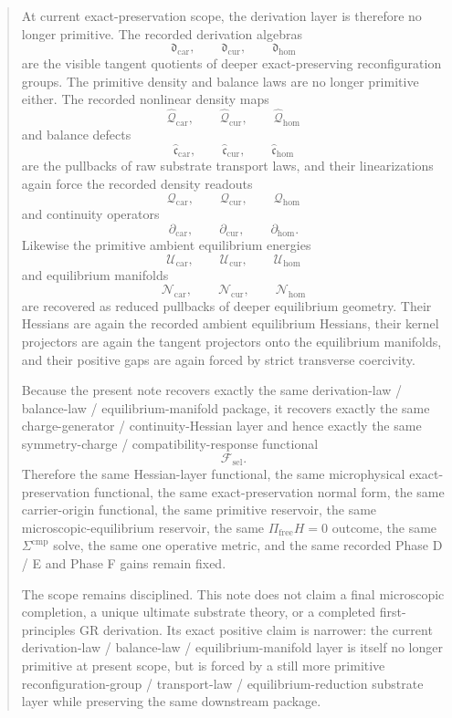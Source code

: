 \documentclass[11pt]{article}
\newcommand{\StemFunctional}{\mathscr F_{\mathrm{sel}}}
\newcommand{\TensorDensity}{\mathcal Q_{\mathrm{car}}}
\newcommand{\CurDensity}{\mathcal Q_{\mathrm{cur}}}
\newcommand{\HomDensity}{\mathcal Q_{\mathrm{hom}}}
\newcommand{\TensorCont}{\partial_{\mathrm{car}}}
\newcommand{\CurCont}{\partial_{\mathrm{cur}}}
\newcommand{\HomCont}{\partial_{\mathrm{hom}}}
\newcommand{\TensorDerAlg}{\mathfrak d_{\mathrm{car}}}
\newcommand{\CurDerAlg}{\mathfrak d_{\mathrm{cur}}}
\newcommand{\HomDerAlg}{\mathfrak d_{\mathrm{hom}}}
\newcommand{\TensorPrimitiveDensity}{\widehat{\mathcal Q}_{\mathrm{car}}}
\newcommand{\CurPrimitiveDensity}{\widehat{\mathcal Q}_{\mathrm{cur}}}
\newcommand{\HomPrimitiveDensity}{\widehat{\mathcal Q}_{\mathrm{hom}}}
\newcommand{\TensorBalance}{\widehat{\mathfrak c}_{\mathrm{car}}}
\newcommand{\CurBalance}{\widehat{\mathfrak c}_{\mathrm{cur}}}
\newcommand{\HomBalance}{\widehat{\mathfrak c}_{\mathrm{hom}}}
\newcommand{\TensorAmbientEnergy}{\mathcal U_{\mathrm{car}}}
\newcommand{\CurAmbientEnergy}{\mathcal U_{\mathrm{cur}}}
\newcommand{\HomAmbientEnergy}{\mathcal U_{\mathrm{hom}}}
\newcommand{\TensorEqManifold}{\mathcal N_{\mathrm{car}}}
\newcommand{\CurEqManifold}{\mathcal N_{\mathrm{cur}}}
\newcommand{\HomEqManifold}{\mathcal N_{\mathrm{hom}}}
\begin{document}
\begin{abstract}
At current exact-preservation scope, the derivation layer is therefore no longer primitive. The recorded derivation algebras
\[
\TensorDerAlg,\qquad
\CurDerAlg,\qquad
\HomDerAlg
\]
are the visible tangent quotients of deeper exact-preserving reconfiguration groups. The primitive density and balance laws are no longer primitive either. The recorded nonlinear density maps
\[
\TensorPrimitiveDensity,\qquad
\CurPrimitiveDensity,\qquad
\HomPrimitiveDensity
\]
and balance defects
\[
\TensorBalance,\qquad
\CurBalance,\qquad
\HomBalance
\]
are the pullbacks of raw substrate transport laws, and their linearizations again force the recorded density readouts
\[
\TensorDensity,\qquad
\CurDensity,\qquad
\HomDensity
\]
and continuity operators
\[
\TensorCont,\qquad
\CurCont,\qquad
\HomCont.
\]
Likewise the primitive ambient equilibrium energies
\[
\TensorAmbientEnergy,\qquad
\CurAmbientEnergy,\qquad
\HomAmbientEnergy
\]
and equilibrium manifolds
\[
\TensorEqManifold,\qquad
\CurEqManifold,\qquad
\HomEqManifold
\]
are recovered as reduced pullbacks of deeper equilibrium geometry. Their Hessians are again the recorded ambient equilibrium Hessians, their kernel projectors are again the tangent projectors onto the equilibrium manifolds, and their positive gaps are again forced by strict transverse coercivity.

Because the present note recovers exactly the same derivation-law / balance-law / equilibrium-manifold package, it recovers exactly the same charge-generator / continuity-Hessian layer and hence exactly the same symmetry-charge / compatibility-response functional
\[
\StemFunctional.
\]
Therefore the same Hessian-layer functional, the same microphysical exact-preservation functional, the same exact-preservation normal form, the same carrier-origin functional, the same primitive reservoir, the same microscopic-equilibrium reservoir, the same \(\Pi_{\mathrm{free}}H=0\) outcome, the same \(\Sigma^{\mathrm{cmp}}\) solve, the same one operative metric, and the same recorded Phase D / E and Phase F gains remain fixed.

The scope remains disciplined. This note does not claim a final microscopic completion, a unique ultimate substrate theory, or a completed first-principles GR derivation. Its exact positive claim is narrower: the current derivation-law / balance-law / equilibrium-manifold layer is itself no longer primitive at present scope, but is forced by a still more primitive reconfiguration-group / transport-law / equilibrium-reduction substrate layer while preserving the same downstream package.
\end{abstract}
\end{document}
